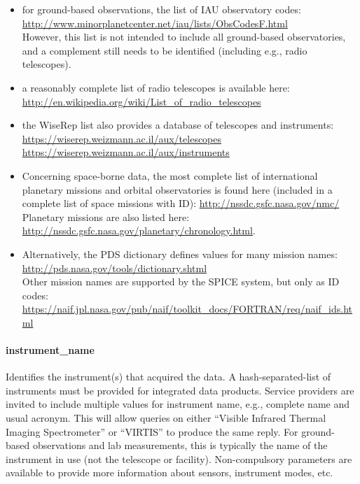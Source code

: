 \documentclass[11pt,a4paper]{ivoa}
\begin{document}
\begin{itemize}
\item for ground-based observations, the list of IAU observatory
codes:\\
\url{http://www.minorplanetcenter.net/iau/lists/ObsCodesF.html}
\\However, this list is not intended to include all ground-based
observatories, and a complement still needs to be identified (including
e.g., radio telescopes).

\item a reasonably complete list of radio telescopes is available here:\\
\url{http://en.wikipedia.org/wiki/List_of_radio_telescopes}

\item the WiseRep list also
provides a  database of telescopes and instruments:\\
\url{https://wiserep.weizmann.ac.il/aux/telescopes}\\
\url{https://wiserep.weizmann.ac.il/aux/instruments}

\item Concerning space-borne data, the most complete list of
international planetary missions and orbital observatories is
found here (included in a complete list of space missions with ID):
\url{http://nssdc.gsfc.nasa.gov/nmc/}\\
Planetary missions are also listed here:
\url{http://nssdc.gsfc.nasa.gov/planetary/chronology.html}.

\item Alternatively, the PDS dictionary defines values
for many mission names:\\
\url{http://pds.nasa.gov/tools/dictionary.shtml}\\
Other mission names are supported by the SPICE system,
but only as ID codes:\\
\url{https://naif.jpl.nasa.gov/pub/naif/toolkit_docs/FORTRAN/req/naif_ids.html}
\end{itemize}

\paragraph{instrument\_name}

Identifies the instrument(s) that acquired the data.
A hash-separated-list of instruments must be provided
for integrated data products.
Service providers are invited to include multiple values
for instrument name, e.g., complete name and usual acronym.
This will allow queries on either
``Visible Infrared Thermal Imaging Spectrometer'' or ``VIRTIS''
to produce the same reply. For ground-based observations and lab
measurements, this is typically the name of the instrument in use (not
the telescope or facility). Non-compulsory parameters are available to
provide more information about sensors, instrument modes, etc.
\end{document}
